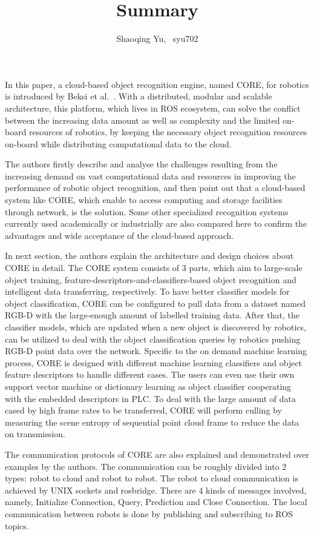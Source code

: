 \documentclass[]{article}
\title{Summary}
\author{Shaoqing Yu, ~syu702}
\date{}
\begin{document}
\maketitle

In this paper, a cloud-based object recognition engine, named CORE, for robotics is introduced by Beksi et al.~\cite{CORE}. With a distributed, modular and scalable architecture, this platform, which lives in ROS ecosystem, can solve the conflict between the increasing data amount as well as complexity and the limited on-board resources of robotics, by keeping the necessary object recognition resources on-board while distributing computational data to the cloud.

The authors firstly describe and analyse the challenges resulting from the increasing demand on vast computational data and resources in improving the performance of robotic object recognition, and then point out that a cloud-based system like CORE, which enable to access computing and storage facilities through network, is the solution. Some other specialized recognition systems currently used academically or industrially are also compared here to confirm the advantages and wide acceptance of the cloud-based approach.

In next section, the authors explain the architecture and design choices about CORE in detail. The CORE system consists of 3 parts, which aim to large-scale object training, feature-descriptors-and-classifiers-based object recognition and intelligent data transferring, respectively. To have better classifier models for object classification, CORE can be configured to pull data from a dataset named RGB-D with the large-enough amount of labelled training data. After that, the classifier models, which are updated when a new object is discovered by robotics, can be utilized to deal with the object classification queries by robotics pushing RGB-D point data over the network. Specific to the on demand machine learning process, CORE is designed with different machine learning classifiers and object feature descriptors to handle different cases. The users can even use their own support vector machine or dictionary learning as object classifier cooperating with the embedded descriptors in PLC. To deal with the large amount of data cased by high frame rates to be transferred, CORE will perform culling by measuring the scene entropy of sequential point cloud frame to reduce the data on transmission.

The communication protocols of CORE are also explained and demonstrated over examples by the authors. The communication can be roughly divided into 2 types: robot to cloud and robot to robot. The robot to cloud communication is achieved by UNIX sockets and rosbridge. There are 4 kinds of messages involved, namely, Initialize Connection, Query, Prediction and Close Connection. The local communication between robots is done by publishing and subscribing to ROS topics.
\end{document}
